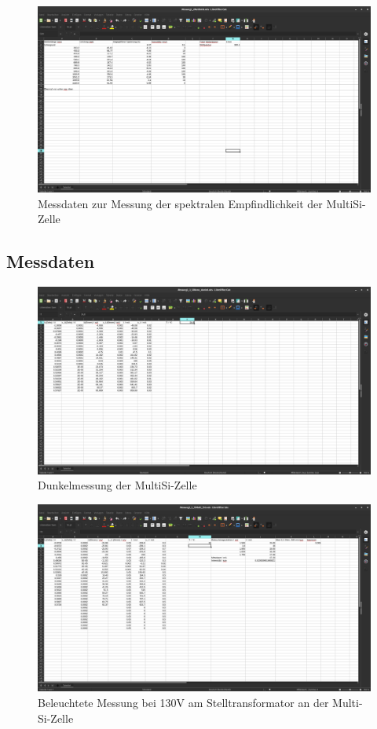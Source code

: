 \begin{figure}[h]
    \captionsetup{justification=centering,margin=2cm}
    \centering
    \includegraphics[angle = 90, width = 12cm]{Bilder/Daten/MessunngMultiSi.png}
    \caption{Messdaten zur Messung der spektralen Empfindlichkeit der MultiSi-Zelle}
\end{figure}

\subsection{Messdaten}
\begin{figure}[h]
    \captionsetup{justification=centering,margin=2cm}
    \centering
    \includegraphics[angle = 90, width = 12cm]{Bilder/Daten/MessunngMonoSiDunkel.png}
    \caption{Dunkelmessung der MultiSi-Zelle}
\end{figure}

\begin{figure}[h]
    \captionsetup{justification=centering,margin=2cm}
    \centering
    \includegraphics[angle = 90, width = 12cm]{Bilder/Daten/MessunngMulriSi130.png}
    \caption{Beleuchtete Messung bei 130V am Stelltransformator an der Multi-Si-Zelle}
\end{figure}


